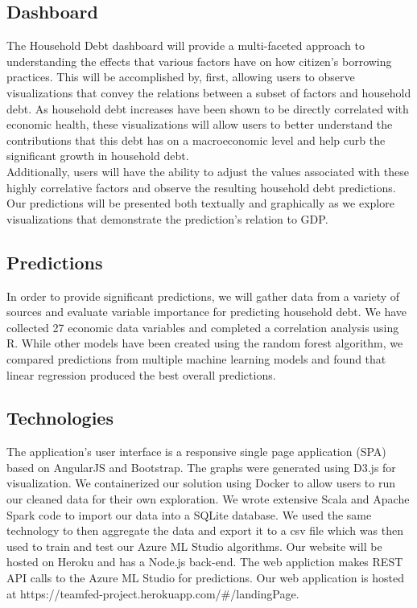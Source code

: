 \documentclass[sigconf,nonacm,11pt]{acmart}
\begin{document}
\subsection{Dashboard}
The Household Debt dashboard will provide a multi-faceted approach to understanding the effects that various factors have on how citizen's borrowing practices.  This will be accomplished by, first, allowing users to observe visualizations that convey the relations between a subset of factors and household debt.  As household debt increases have been shown to be directly correlated with economic health\cite{Mian2015}, these visualizations will allow users to better understand the contributions that this debt has on a macroeconomic level and help curb the significant growth in household debt\cite{Alter2018}.\\
Additionally, users will have the ability to adjust the values associated with these highly correlative factors and observe the resulting household debt predictions.  Our predictions will be presented both textually and graphically as we explore visualizations that demonstrate the prediction's relation to GDP.\vspace{-0.5em}

\subsection{Predictions}

In order to provide significant predictions, we will gather data from a variety of sources and evaluate variable importance for predicting household debt. We have collected 27 economic data variables and completed a correlation analysis using R.  While other models have been created using the random forest algorithm\cite{Nyman2018}, we compared predictions from multiple machine learning models and found that linear regression produced the best overall predictions.\vspace{-0.5em}

\subsection{Technologies}

The application's user interface is a responsive single page application (SPA) based on AngularJS and Bootstrap. The graphs were generated using D3.js for visualization. We containerized our solution using Docker to allow users to run our cleaned data for their own exploration. We wrote extensive Scala and Apache Spark code to import our data into a SQLite database. We used the same technology to then aggregate the data and export it to a csv file which was then used to train and test our Azure ML Studio algorithms. Our website will be hosted on Heroku and has a Node.js back-end. The web appliction makes REST API calls to the Azure ML Studio for predictions. Our web application is hosted at https://teamfed-project.herokuapp.com/#/landingPage.  
\end{document}
